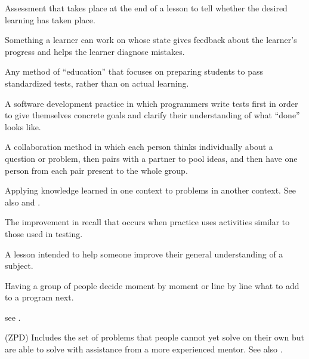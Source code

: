 \begin{description}
 Assessment that takes
place at the end of a lesson to tell whether the desired learning has taken
place.

 Something a learner can work on
whose state gives feedback about the learner's progress and helps the learner
diagnose mistakes.

 Any method of ``education''
that focuses on preparing students to pass standardized tests, rather than on
actual learning.

 A software
development practice in which programmers write tests first in order to give
themselves concrete goals and clarify their understanding of what ``done'' looks
like.

 A collaboration method in which
each person thinks individually about a question or problem, then pairs with a
partner to pool ideas, and then have one person from each pair present to the
whole group.

 Applying knowledge learned
in one context to problems in another context.  See also
 and .

 The
improvement in recall that occurs when practice uses activities similar to those
used in testing.

 A lesson intended to help someone improve their
general understanding of a subject.

 Having a group of people decide moment
by moment or line by line what to add to a program next.

 see .

 (ZPD) Includes the set of problems that
people cannot yet solve on their own but are able to solve with assistance from
a more experienced mentor.  See also .

\end{description}
